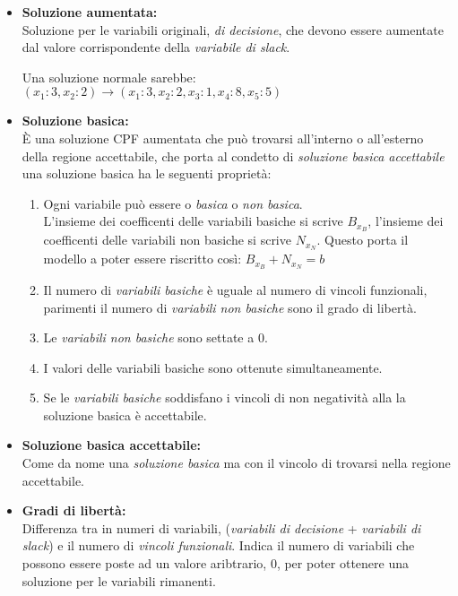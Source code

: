 \documentclass{article}
\begin{document}
\begin{itemize}
  \item \textbf{Soluzione aumentata:} \\
        Soluzione per le variabili originali, \textit{di decisione}, che devono essere aumentate dal valore corrispondente della \textit{variabile di slack}. \\
        \begin{tcolorbox}[
            colback=lightgray,
            colframe=black,
            coltext=black,
            title=Esempio,
            colbacktitle=black,
            coltitle=lightgray,
            breakable
          ]
          Una soluzione normale sarebbe: $(x_1:3,x_2:2) \to (x_1:3,x_2:2, x_3:1, x_4:8, x_5:5) $
        \end{tcolorbox}
  \item \textbf{Soluzione basica:} \\
        È una soluzione CPF aumentata che può trovarsi all'interno o all'esterno della regione accettabile, che porta al condetto di \textit{soluzione basica accettabile} una soluzione basica ha le seguenti proprietà:
        \begin{enumerate}
          \item Ogni variabile può essere o \textit{basica} o \textit{non basica}. \\
                L'insieme dei coefficenti delle variabili basiche si scrive $B_{x_B}$, l'insieme dei coefficenti delle variabili non basiche si scrive $N_{x_N}$. Questo porta il modello a poter essere riscritto così: $B_{x_B}+N_{x_N}=b$
          \item Il numero di \textit{variabili basiche} è uguale al numero di vincoli funzionali, parimenti il numero di \textit{variabili non basiche} sono il grado di libertà.
          \item Le \textit{variabili non basiche} sono settate a $0$.
          \item I valori delle variabili basiche sono ottenute simultaneamente.
          \item Se le \textit{variabili basiche} soddisfano i vincoli di non negatività alla la soluzione basica è accettabile.
        \end{enumerate}
  \item \textbf{Soluzione basica accettabile:}\\
        Come da nome una \textit{soluzione basica} ma con il vincolo di trovarsi nella regione accettabile.
  \item \textbf{Gradi di libertà:} \\
        Differenza tra in numeri di variabili, (\textit{variabili di decisione} + \textit{variabili di slack}) e il numero di \textit{vincoli funzionali}. Indica il numero di variabili che possono essere poste ad un valore aribtrario, $0$, per poter ottenere una soluzione per le variabili rimanenti.
\end{itemize}
\end{document}

